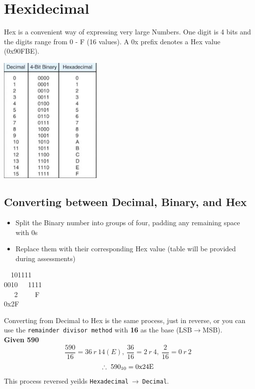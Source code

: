 \documentclass[a4paper,12pt]{article}
\begin{document}
        \section*{Hexidecimal}
        \begin{minipage}{8cm}
            Hex is a convenient way of expressing very large Numbers. One digit is 4 bits and the digits range from 0 - F (16 values). A 0x prefix denotes a Hex value (0x90FBE).    
        \end{minipage}
        \hspace{20pt}
        \begin{minipage}{10cm}
            \includegraphics[width=5cm]{Hex tables.JPG}
        \end{minipage}
        \subsection*{Converting between Decimal, Binary, and Hex} 
        \begin{minipage}{10cm}
            \begin{itemize}
                \item Split the Binary number into groups of four, padding any remaining space with 0s
                \item Replace them with their corresponding Hex value (table will be provided during assessments)
            \end{itemize}
        \end{minipage}
        \hspace{0.05\textwidth}
        \begin{minipage}{10cm}
            ~~101111\\0010~~~1111\\~~~2~~~~~F\\0x2F
        \end{minipage}
        \vspace{12pt}
        \par Converting from Decimal to Hex is the same process, just in reverse, or you can use the \texttt{remainder divisor method} with \textbf{16} as the base (LSB$\rightarrow$MSB).\\\textbf{Given 590} \[\frac{590}{16}=36~r~14(E),~\frac{36}{16}=2~r~4,~\frac{2}{16}=0~r~2\] \[\therefore~590_{10}=0\textnormal{x}24\textnormal{E}\]
        This process reversed yeilds \texttt{Hexadecimal}$~\rightarrow~$\texttt{Decimal}.
\end{document}
